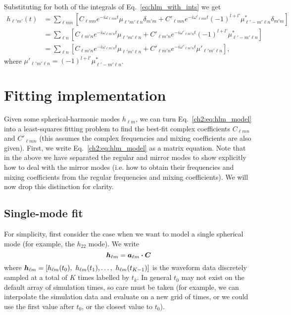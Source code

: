Substituting for both of the integrals of Eq.~\ref{eq:hlm_with_ints} we get
\begin{align}\label{ch2:eq:hlm_model}
    h_{\ell' m'}(t) &= \sum_{\ell m n} \left[ C_{\ell m n} e^{-i \omega_{\ell m n} t} \mu_{\ell' m' \ell n} \delta_{m' m} + C'_{\ell m n} e^{-i \omega'_{\ell m n} t} (-1)^{l+l'} \mu^*_{\ell' -m' \ell n} \delta_{m' m} \right] \nonumber \\
    &= \sum_{\ell n} \left[ C_{\ell m' n} e^{-i \omega_{\ell m' n} t} \mu_{\ell' m' \ell n} + C'_{\ell m' n} e^{-i \omega'_{\ell m' n} t} (-1)^{l+l'} \mu^*_{\ell' -m' \ell n} \right] \nonumber \\
    &= \sum_{\ell n} \left[ C_{\ell m' n} e^{-i \omega_{\ell m' n} t} \mu_{\ell' m' \ell n} + C'_{\ell m' n} e^{-i \omega'_{\ell m' n} t} \mu'_{\ell' m' \ell n} \right],
\end{align}
where $\mu'_{\ell' m' \ell n} = (-1)^{l+l'} \mu^*_{\ell' -m' \ell n}$.

\section{Fitting implementation}
\label{ch2:sec:fitting}

Given some spherical-harmonic modes $h_{\ell m}$, we can turn Eq.~\ref{ch2:eq:hlm_model} into a least-squares fitting problem to find the best-fit complex coefficients $C_{\ell m n}$ and $C'_{\ell m n}$ (this assumes the complex frequencies and mixing coefficients are also given). 
First, we write Eq.~\ref{ch2:eq:hlm_model} as a matrix equation. 
Note that in the above we have separated the regular and mirror modes to show explicitly how to deal with the mirror modes (i.e. how to obtain their frequencies and mixing coefficients from the regular frequencies and mixing coefficients). 
We will now drop this distinction for clarity.

\subsection{Single-mode fit}

For simplicity, first consider the case when we want to model a single spherical mode (for example, the $h_{22}$ mode). We write
\begin{equation}\label{eq:hlm_matrix_single}
    \vb*{h}_{\ell m} = \vb*{a}_{\ell m} \vdot \vb*{C}
\end{equation}
where $\vb*{h}_{\ell m} = \left[h_{\ell m}(t_0),\ h_{\ell m}(t_1), \ldots,\ h_{\ell m}(t_{K-1}) \right]$ is the waveform data discretely sampled at a total of $K$ times labelled by $t_k$. 
In general $t_0$ may not exist on the default array of simulation times, so care must be taken (for example, we can interpolate the simulation data and evaluate on a new grid of times, or we could use the first value after $t_0$, or the closest value to $t_0$). 

